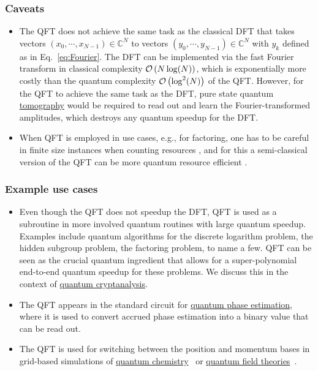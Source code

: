 \begin{refsection}

\subsubsection*{Caveats}

\begin{itemize}
    \item The QFT does not achieve the same task as the classical DFT that takes vectors $(x_0,\cdots,x_{N-1})\in\mathbb{C}^N$ to vectors $(y_0,\cdots,y_{N-1})\in\mathbb{C}^N$ with $y_k$ defined as in Eq.~\eqref{eq:Fourier}. The DFT can be implemented via the fast Fourier transform in classical complexity $\mathcal{O}\left( N\log(N) \right)$, which is exponentially more costly than the quantum complexity $\mathcal{O}\left( \log^2(N) \right)$ of the QFT. However, for the QFT to achieve the same task as the DFT, pure state quantum \hyperref[prim:Tomography]{tomography} would be required to read out and learn the Fourier-transformed amplitudes, which destroys any quantum speedup for the DFT.
    \item When QFT is employed in use cases, e.g., for factoring, one has to be careful in finite size instances when counting resources \cite{smolin2013OverQF}, and for this a semi-classical version of the QFT can be more quantum resource efficient \cite{griffiths1996semiclassicalQFT}.
\end{itemize}


\subsubsection*{Example use cases}

\begin{itemize}
    \item Even though the QFT does not speedup the DFT, QFT is used as a subroutine in more involved quantum routines with large quantum speedup. Examples include quantum algorithms for the discrete logarithm problem, the hidden subgroup problem, the factoring problem, to name a few. QFT can be seen as the crucial quantum ingredient that allows for a super-polynomial end-to-end quantum speedup for these problems. We discuss this in the context of \hyperref[appl:cryptanalysis]{quantum cryptanalysis}. 
    \item The QFT appears in the standard circuit for \hyperref[prim:QPE]{quantum phase estimation}, where it is used to convert accrued phase estimation into a binary value that can be read out.
    \item The QFT is used for switching between the position and momentum bases in grid-based simulations of \hyperref[appl:ElectronicStructure]{quantum chemistry}~\cite{kassal2008QuantumSimChemicalDynamics} or \hyperref[appl:QuantumFieldTheories]{quantum field theories}~\cite{jordan2012QuantumFieldTheory}.
\end{itemize}


\end{refsection}
